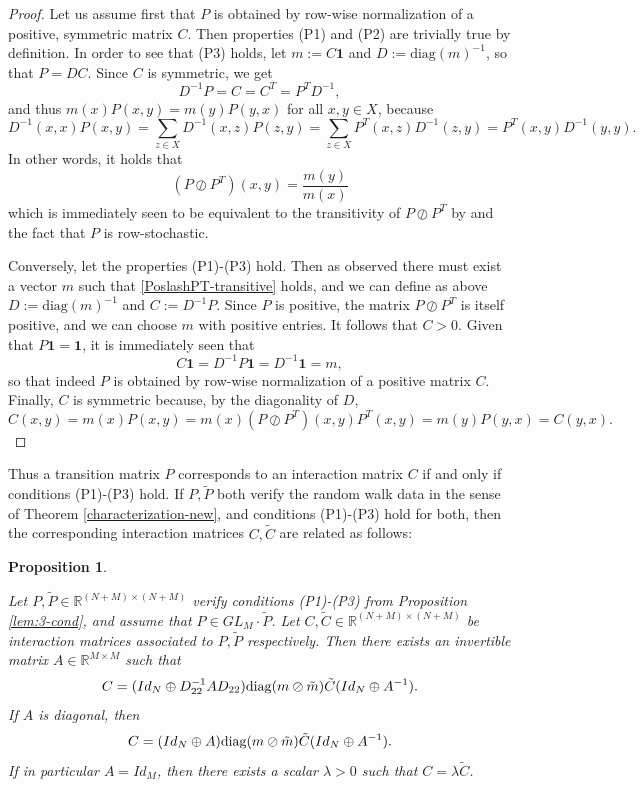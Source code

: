 \documentclass[a4paper,11pt,oneside]{amsart}
\newtheorem{proposition}[theorem]{Proposition}
\newcommand{\R}{{\mathbb R}}
\begin{document}
\begin{proof}
    Let us assume first that $P$ is obtained by row-wise normalization of a positive, symmetric matrix $C$. Then properties (P1) and (P2) are trivially true by definition. In order to see that (P3) holds, let $m:= C\mathbf 1$ and $D:= \mbox{diag}(m)^{-1}$, so that $P= DC$. Since $C$ is symmetric, we get
$$ D^{-1}P = C = C^T = P^T D^{-1}, $$
and thus $m(x)P(x,y)=m(y)P(y,x)$ for all $x,y\in X$, because
$$ D^{-1}(x,x)P(x,y) = \sum_{z\in X} D^{-1}(x,z)P(z,y) = \sum_{z\in X} P^T(x,z) D^{-1}(z,y) = P^T(x,y) D^{-1}(y,y).$$
In other words, it holds that
\begin{equation}\label{PoslashPT-transitive}
    (P\oslash P^T)(x,y) = \frac{m(y)}{m(x)}
\end{equation} 
which is immediately seen to be equivalent to the transitivity of $P\oslash P^T$ by \cite[Proposition 1]{FRS99} and the fact that $P$ is row-stochastic.

Conversely, let the properties (P1)-(P3) hold. Then as observed there must exist a vector $m$ such that \eqref{PoslashPT-transitive} holds, and we can define as above $D:= \mbox{diag}(m)^{-1}$ and $C := D^{-1}P$. Since $P$ is positive, the matrix $P\oslash P^T$ is itself positive, and we can choose $m$ with positive entries. It follows that $C>0$. Given that $P\mathbf 1 = \mathbf 1$, it is immediately seen that 
$$ C\mathbf 1 = D^{-1}P\mathbf 1 = D^{-1}\mathbf 1 = m, $$
so that indeed $P$ is obtained by row-wise normalization of a positive matrix $C$. Finally, $C$ is symmetric because, by the diagonality of $D$,
$$ C(x,y) = m(x)P(x,y) = m(x) (P\oslash P^T)(x,y) P^T(x,y) = m(y)P(y,x)=C(y,x). $$
\end{proof}

Thus a transition matrix $P$ corresponds to an interaction matrix $C$ if and only if conditions (P1)-(P3) hold. If $P,\tilde P$ both verify the random walk data in the sense of Theorem \ref{characterization-new}, and conditions (P1)-(P3) hold for both, then the corresponding interaction matrices $C,\tilde C$ are related as follows:

\begin{proposition}\label{C-from-P-new}

Let $P,\tilde P \in \R^{(N+M)\times (N+M)}$ verify conditions (P1)-(P3) from Proposition \ref{lem:3-cond}, and assume that $P\in GL_M\cdot\tilde P$. Let $C, \tilde C \in \R^{(N+M)\times (N+M)}$ be interaction matrices associated to $P, \tilde P$  respectively. Then there exists an invertible matrix $A \in \R^{M\times M}$ such that $$C =(Id_N\oplus D_{22}^{-1}AD_{22}) \mbox{\emph{diag}}(m\oslash \tilde m)\tilde C (Id_N\oplus A^{-1}).$$ 
    If $A$ is diagonal, then 
    $$C =(Id_N\oplus A) \mbox{\emph{diag}}(m\oslash \tilde m)\tilde C (Id_N\oplus A^{-1}).$$
    If in particular $A=Id_M$, then there exists a scalar $\lambda>0$ such that $C=\lambda\tilde C$.
\end{proposition}
\end{document}
